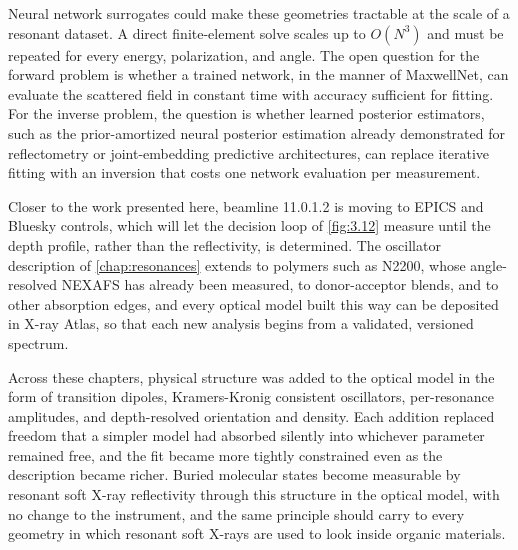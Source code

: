 Neural network surrogates could make these geometries tractable at the scale of a resonant dataset. A direct finite-element solve scales up to \(O\left( N^{3} \right)\) and must be repeated for every energy, polarization, and angle. The open question for the forward problem is whether a trained network, in the manner of MaxwellNet\autocite{limMaxwellNetPhysicsdrivenDeep2022}, can evaluate the scattered field in constant time with accuracy sufficient for fitting. For the inverse problem, the question is whether learned posterior estimators, such as the prior-amortized neural posterior estimation already demonstrated for reflectometry\autocite{starostinFastReliableProbabilistic2025} or joint-embedding predictive architectures\autocite{assranSelfSupervisedLearningImages2023}, can replace iterative fitting with an inversion that costs one network evaluation per measurement.

Closer to the work presented here, beamline 11.0.1.2 is moving to EPICS and Bluesky controls, which will let the decision loop of \cref{fig:3.12} measure until the depth profile, rather than the reflectivity, is determined. The oscillator description of \cref{chap:resonances} extends to polymers such as N2200, whose angle-resolved NEXAFS has already been measured\autocite{gannNearedgeXrayAbsorption2014}, to donor-acceptor blends, and to other absorption edges\autocite{chantlerNEXAFSSpectroscopyP3HT2026,freychetResolvingBackboneTilt2022}, and every optical model built this way can be deposited in X-ray Atlas, so that each new analysis begins from a validated, versioned spectrum.

Across these chapters, physical structure was added to the optical model in the form of transition dipoles, Kramers-Kronig consistent oscillators, per-resonance amplitudes, and depth-resolved orientation and density. Each addition replaced freedom that a simpler model had absorbed silently into whichever parameter remained free, and the fit became more tightly constrained even as the description became richer. Buried molecular states become measurable by resonant soft X-ray reflectivity through this structure in the optical model, with no change to the instrument, and the same principle should carry to every geometry in which resonant soft X-rays are used to look inside organic materials.
